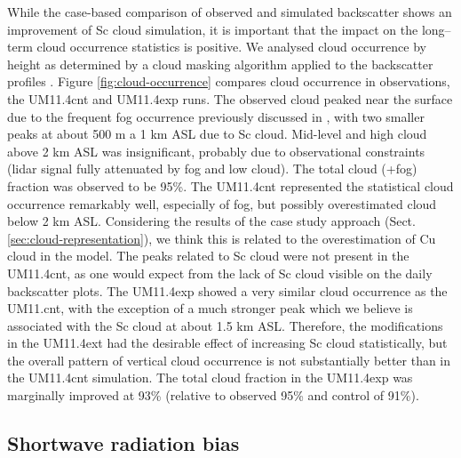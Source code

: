 While the case-based comparison of observed and simulated backscatter
shows an improvement of Sc cloud simulation, it is important that the impact
on the long--term cloud occurrence statistics is positive. We analysed
cloud occurrence by height as determined by a cloud masking algorithm
applied to the backscatter profiles \citep{kuma2020b}.
Figure \ref{fig:cloud-occurrence} compares cloud occurrence in observations,
the UM11.4cnt and UM11.4exp runs. The observed cloud peaked near the surface due to
the frequent fog occurrence previously discussed in \cite{kuma2020a},
with two smaller peaks at about 500 m a 1 km ASL due to Sc cloud.
Mid-level and high cloud above 2 km ASL was insignificant, probably due
to observational constraints (lidar signal fully attenuated by fog and low
cloud). The total cloud (+fog) fraction was observed to be 95\%.
The UM11.4cnt represented the statistical cloud occurrence remarkably well,
especially of fog, but possibly overestimated cloud below 2 km ASL. Considering
the results of the case study approach (Sect. \ref{sec:cloud-representation}), we think this is related to the
overestimation of Cu cloud in the model. The peaks related to Sc cloud were not present in the UM11.4cnt, as one would expect from the lack of Sc cloud
visible on the daily backscatter plots. The UM11.4exp showed a very similar
cloud occurrence as the UM11.cnt, with the exception of a much stronger peak which we believe is  associated with the Sc cloud at about 1.5 km ASL. Therefore, the modifications
in the UM11.4ext had the desirable effect of increasing Sc cloud statistically,
but the overall pattern of vertical cloud occurrence is not substantially better
than in the UM11.4cnt simulation. The total cloud fraction in the UM11.4exp was marginally
improved at 93\% (relative to observed 95\% and control of 91\%).


\subsection{Shortwave radiation bias}
\label{sec:sw-bias}

